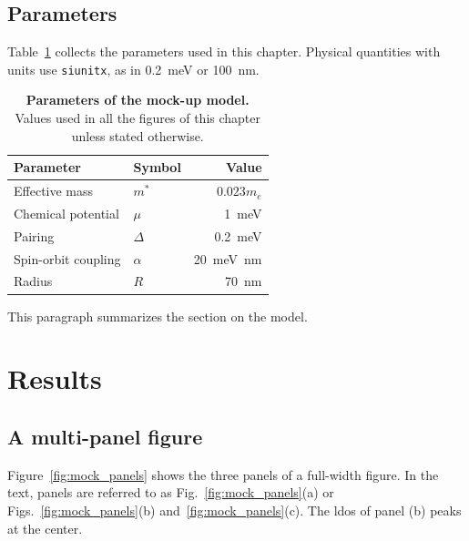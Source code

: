 \documentclass[../main]{subfiles}
\begin{document}
\subsection{Parameters}
\label{sec:parameters}
Table~\ref{tab:parameters} collects the parameters used in this chapter.
Physical quantities with units use \verb|siunitx|, as in \SI{0.2}{\milli\electronvolt} or \SI{100}{\nano\meter}.

\begin{table}[hbtp]
    \centering
    \caption[Parameters of the mock-up model]{\textbf{Parameters of the mock-up model.}
    Values used in all the figures of this chapter unless stated otherwise.
    }
    \label{tab:parameters}
    \begin{tabular}{@{}llr@{}}
        \toprule
        Parameter & Symbol & Value \\
        \midrule
        Effective mass & $m^*$ & $0.023m_e$ \\
        Chemical potential & $\mu$ & \SI{1}{\milli\electronvolt} \\
        Pairing & $\Delta$ & \SI{0.2}{\milli\electronvolt} \\
        Spin-orbit coupling & $\alpha$ & \SI{20}{\milli\electronvolt\nano\meter} \\
        Radius & $R$ & \SI{70}{\nano\meter} \\
        \bottomrule
    \end{tabular}
\end{table}

\lipsum[4][1-5]

\sectionclose
This paragraph summarizes the section on the model.
\lipsum[5][1-2]

\section{Results}
\label{sec:results}
\lipsum[6][1-3]

\subsection{A multi-panel figure}
\label{sec:multipanel}
Figure~\ref{fig:mock_panels} shows the three panels of a full-width figure.
In the text, panels are referred to as Fig.~\ref{fig:mock_panels}(a) or Figs.~\ref{fig:mock_panels}(b) and~\ref{fig:mock_panels}(c).
The \acrshort{ldos} of panel (b) peaks at the center.
\end{document}

